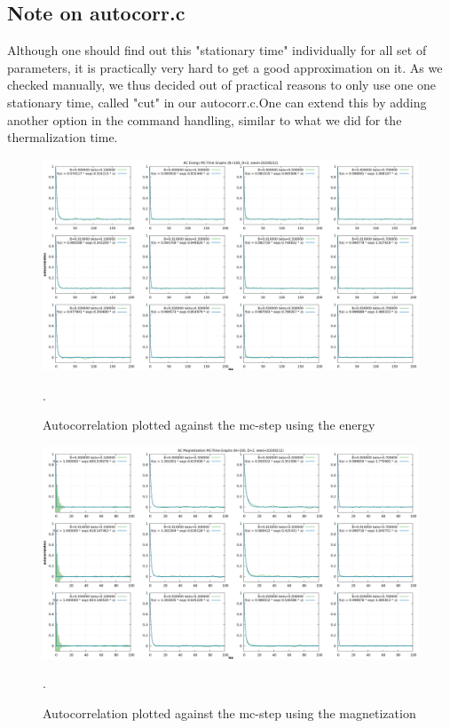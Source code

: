 \documentclass[11pt,a4paper]{article}
\begin{document}
\subsection{Note on autocorr.c}

Although one should find out this "stationary time" individually for all set of parameters, it is practically very hard to get a good approximation on it. As we checked manually, we thus decided out of practical reasons to only use one one stationary time, called "cut" in our autocorr.c.One can extend this by adding another option in the command handling, similar to what we did for the thermalization time. 
  


\begin{figure}
\centering
\includegraphics[scale=0.50]{all_ac_energy.png}
\caption{Autocorrelation plotted against the mc-step using the energy}.
\label{fig:foo70}
\end{figure}

\begin{figure}
\centering
\includegraphics[scale=0.35]{all_ac_magnet.png}
\caption{Autocorrelation plotted against the mc-step using the magnetization}.
\label{fig:foo71}
\end{figure}
\end{document}
